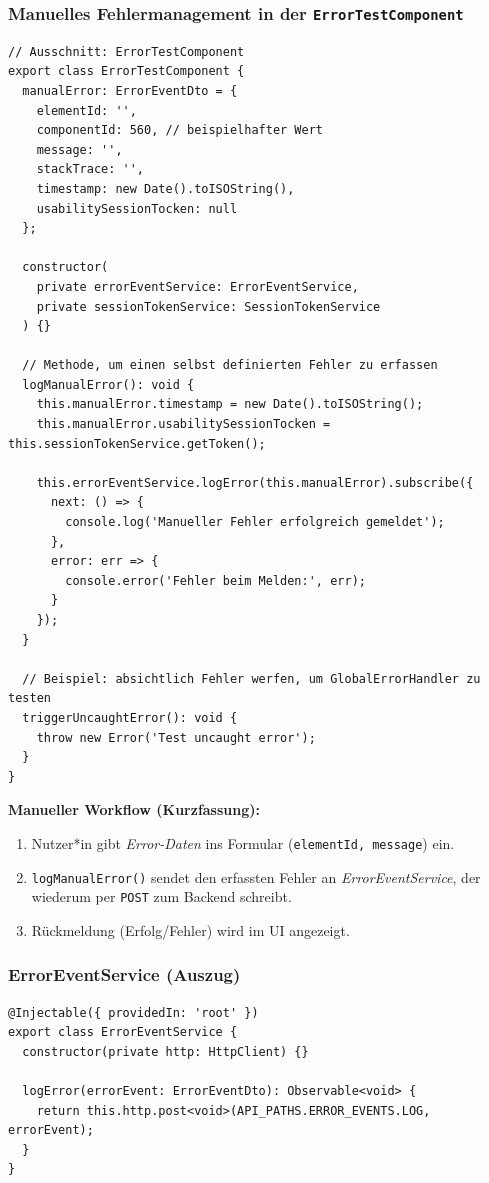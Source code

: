 \documentclass[12pt,oneside]{article}
\begin{document}
\subsubsection{Manuelles Fehlermanagement in der \texttt{ErrorTestComponent}}
\begin{lstlisting}
// Ausschnitt: ErrorTestComponent
export class ErrorTestComponent {
  manualError: ErrorEventDto = {
    elementId: '',
    componentId: 560, // beispielhafter Wert
    message: '',
    stackTrace: '',
    timestamp: new Date().toISOString(),
    usabilitySessionTocken: null
  };

  constructor(
    private errorEventService: ErrorEventService,
    private sessionTokenService: SessionTokenService
  ) {}

  // Methode, um einen selbst definierten Fehler zu erfassen
  logManualError(): void {
    this.manualError.timestamp = new Date().toISOString();
    this.manualError.usabilitySessionTocken = this.sessionTokenService.getToken();

    this.errorEventService.logError(this.manualError).subscribe({
      next: () => {
        console.log('Manueller Fehler erfolgreich gemeldet');
      },
      error: err => {
        console.error('Fehler beim Melden:', err);
      }
    });
  }

  // Beispiel: absichtlich Fehler werfen, um GlobalErrorHandler zu testen
  triggerUncaughtError(): void {
    throw new Error('Test uncaught error');
  }
}
\end{lstlisting}

\noindent
\textbf{Manueller Workflow (Kurzfassung):}
\begin{enumerate}
  \item Nutzer*in gibt \emph{Error-Daten} ins Formular (\lstinline|elementId, message|) ein.
  \item \lstinline|logManualError()| sendet den erfassten Fehler an \emph{ErrorEventService}, der wiederum per \lstinline|POST| zum Backend schreibt.
  \item Rückmeldung (Erfolg/Fehler) wird im UI angezeigt.
\end{enumerate}

\subsubsection{ErrorEventService (Auszug)}
\begin{lstlisting}
@Injectable({ providedIn: 'root' })
export class ErrorEventService {
  constructor(private http: HttpClient) {}

  logError(errorEvent: ErrorEventDto): Observable<void> {
    return this.http.post<void>(API_PATHS.ERROR_EVENTS.LOG, errorEvent);
  }
}
\end{lstlisting}
\end{document}
